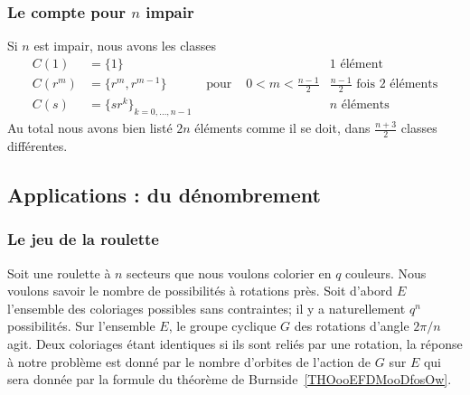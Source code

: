 \subsubsection{Le compte pour $ n$ impair}
\label{GJIzDEP}

Si \( n\) est impair, nous avons les classes
\begin{subequations}
    \begin{align}
        C(1)&=\{ 1 \}       &&& 1\text{ élément}\\
        C(r^m)&=\{ r^m,r^{m-1} \}&\text{ pour }&0<m<\frac{ n-1 }{2}   & \frac{ n-1 }{2}\text{ fois } 2\text{ éléments}\\
        C(s)&=\{ sr^k \}_{k=0,\ldots, n-1} &&&  n\text{ éléments}
    \end{align}
\end{subequations}
Au total nous avons bien listé \( 2n\) éléments comme il se doit, dans \(  \frac{ n+3 }{2}\) classes différentes.

\subsection{Applications : du dénombrement}

\subsubsection{Le jeu de la roulette}
\label{pTqJLY}

Soit une roulette à \( n\) secteurs que nous voulons colorier en \( q\) couleurs\cite{HEBOFl}. Nous voulons savoir le nombre de possibilités à rotations près. Soit d'abord \( E\) l'ensemble des coloriages possibles sans contraintes; il y a naturellement \( q^n\) possibilités. Sur l'ensemble \( E\), le groupe cyclique \( G\) des rotations d'angle \( 2\pi/n\) agit. Deux coloriages étant identiques si ils sont reliés par une rotation, la réponse à notre problème est donné par le nombre d'orbites de l'action de \( G\) sur \( E\) qui sera donnée par la formule du théorème de Burnside~\ref{THOooEFDMooDfosOw}.

